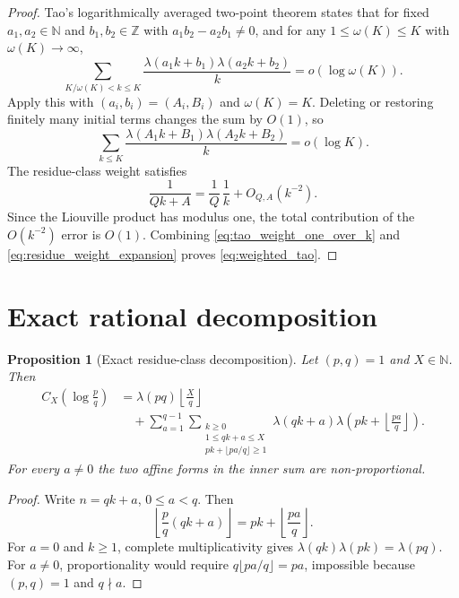 \documentclass[preprint,12pt]{elsarticle}
\numberwithin{equation}{section}
\theoremstyle{plain}
\newtheorem{proposition}[theorem]{Proposition}
\theoremstyle{definition}
\theoremstyle{remark}
\begin{document}
\begin{proof}
Tao's logarithmically averaged two-point theorem
\cite[Theorem~1.2]{Tao2016} states that for fixed
$a_1,a_2\in\mathbb N$ and $b_1,b_2\in\mathbb Z$ with
$a_1b_2-a_2b_1\ne0$, and for any
$1\le\omega(K)\le K$ with $\omega(K)\to\infty$,
\begin{equation}
\sum_{K/\omega(K)<k\le K}
\frac{\lambda(a_1k+b_1)\lambda(a_2k+b_2)}{k}
=o(\log\omega(K)).
\label{eq:tao_theorem_form}
\end{equation}
Apply this with $(a_i,b_i)=(A_i,B_i)$ and $\omega(K)=K$.
Deleting or restoring finitely many initial terms changes the sum by $O(1)$,
so
\begin{equation}
\sum_{k\le K}
\frac{\lambda(A_1k+B_1)\lambda(A_2k+B_2)}{k}
=o(\log K).
\label{eq:tao_weight_one_over_k}
\end{equation}
The residue-class weight satisfies
\begin{equation}
\frac1{Qk+A}=\frac1Q\,\frac1k+O_{Q,A}(k^{-2}).
\label{eq:residue_weight_expansion}
\end{equation}
Since the Liouville product has modulus one, the total contribution of the
$O(k^{-2})$ error is $O(1)$. Combining
\eqref{eq:tao_weight_one_over_k} and
\eqref{eq:residue_weight_expansion} proves \eqref{eq:weighted_tao}.
\end{proof}

\section{Exact rational decomposition}
\label{sec:rational}

\begin{proposition}[Exact residue-class decomposition]
\label{prop:decomposition}
Let $(p,q)=1$ and $X\in\mathbb N$. Then
\begin{align}
C_X\!\left(\log\frac pq\right)
&=
\lambda(pq)\left\lfloor\frac Xq\right\rfloor \nonumber\\
&\quad+
\sum_{a=1}^{q-1}
\sum_{\substack{k\ge0\\1\le qk+a\le X\\
pk+\lfloor pa/q\rfloor\ge1}}
\lambda(qk+a)
\lambda\!\left(pk+\left\lfloor\frac{pa}{q}\right\rfloor\right).
\label{eq:decomp}
\end{align}
For every $a\ne0$ the two affine forms in the inner sum are
non-proportional.
\end{proposition}

\begin{proof}
Write $n=qk+a$, $0\le a<q$. Then
\[
\left\lfloor\frac pq(qk+a)\right\rfloor
=
pk+\left\lfloor\frac{pa}{q}\right\rfloor.
\]
For $a=0$ and $k\ge1$, complete multiplicativity gives
$\lambda(qk)\lambda(pk)=\lambda(pq)$. For $a\ne0$, proportionality would
require $q\lfloor pa/q\rfloor=pa$, impossible because $(p,q)=1$ and
$q\nmid a$.
\end{proof}
\end{document}
